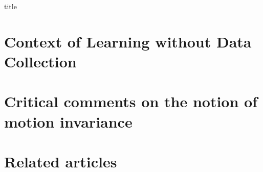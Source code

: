 \documentclass[12pt]{article}
\begin{document}
{title}

\tableofcontents



 



\section{Context of Learning without Data Collection}
\section{Critical comments on the notion of motion invariance}
\section{Related articles}
\end{document}

